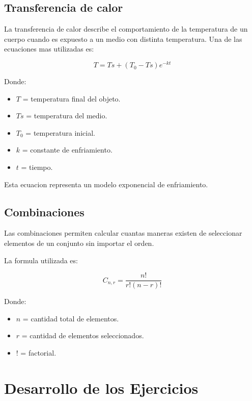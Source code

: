 \documentclass[12pt]{article}
\begin{document}
\subsection{Transferencia de calor}

La transferencia de calor describe el comportamiento de la temperatura de un cuerpo cuando es expuesto a un medio con distinta temperatura. Una de las ecuaciones mas utilizadas es:

\[
T = Ts + (T_0 - Ts)e^{-kt}
\]

Donde:

\begin{itemize}
\item $T$ = temperatura final del objeto.
\item $Ts$ = temperatura del medio.
\item $T_0$ = temperatura inicial.
\item $k$ = constante de enfriamiento.
\item $t$ = tiempo.
\end{itemize}

Esta ecuacion representa un modelo exponencial de enfriamiento.

\subsection{Combinaciones}

Las combinaciones permiten calcular cuantas maneras existen de seleccionar elementos de un conjunto sin importar el orden.

La formula utilizada es:

\[
C_{n,r} = \frac{n!}{r!(n-r)!}
\]

Donde:

\begin{itemize}
\item $n$ = cantidad total de elementos.
\item $r$ = cantidad de elementos seleccionados.
\item $!$ = factorial.
\end{itemize}


\section{Desarrollo de los Ejercicios}
\end{document}
